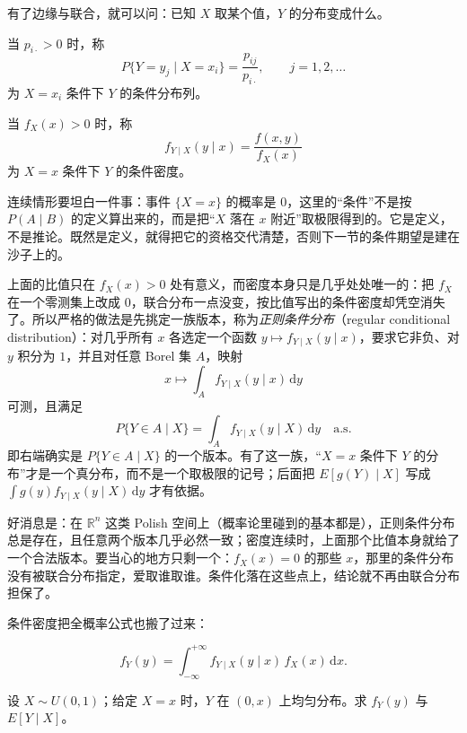 有了边缘与联合，就可以问：已知 $X$ 取某个值，$Y$ 的分布变成什么。

\begin{definition}[离散型条件分布]
当 $p_{i\cdot}>0$ 时，称
\[
P\{Y=y_j\mid X=x_i\}=\frac{p_{ij}}{p_{i\cdot}},\qquad j=1,2,\dots
\]
为 $X=x_i$ 条件下 $Y$ 的条件分布列。
\end{definition}

\begin{definition}[连续型条件密度]
当 $f_X(x)>0$ 时，称
\[
f_{Y\mid X}(y\mid x)=\frac{f(x,y)}{f_X(x)}
\]
为 $X=x$ 条件下 $Y$ 的条件密度。
\end{definition}

连续情形要坦白一件事：事件 $\{X=x\}$ 的概率是 $0$，这里的“条件”不是按 $P(A\mid B)$ 的定义算出来的，而是把“$X$ 落在 $x$ 附近”取极限得到的。它是定义，不是推论。既然是定义，就得把它的资格交代清楚，否则下一节的条件期望是建在沙子上的。

\begin{remark}[正则条件分布]
上面的比值只在 $f_X(x)>0$ 处有意义，而密度本身只是几乎处处唯一的：把 $f_X$ 在一个零测集上改成 $0$，联合分布一点没变，按比值写出的条件密度却凭空消失了。所以严格的做法是先挑定一族版本，称为\emph{正则条件分布}（regular conditional distribution）：对几乎所有 $x$ 各选定一个函数 $y\mapsto f_{Y\mid X}(y\mid x)$，要求它非负、对 $y$ 积分为 $1$，并且对任意 Borel 集 $A$，映射
\[
x\longmapsto \int_A f_{Y\mid X}(y\mid x)\,\mathrm{d}y
\]
可测，且满足
\[
P\{Y\in A\mid X\}=\int_A f_{Y\mid X}(y\mid X)\,\mathrm{d}y\quad\text{a.s.}
\]
即右端确实是 $P\{Y\in A\mid X\}$ 的一个版本。有了这一族，“$X=x$ 条件下 $Y$ 的分布”才是一个真分布，而不是一个取极限的记号；后面把 $E[g(Y)\mid X]$ 写成 $\int g(y)f_{Y\mid X}(y\mid X)\,\mathrm{d}y$ 才有依据。

好消息是：在 $\mathbb{R}^n$ 这类 Polish 空间上（概率论里碰到的基本都是），正则条件分布总是存在，且任意两个版本几乎必然一致；密度连续时，上面那个比值本身就给了一个合法版本。要当心的地方只剩一个：$f_X(x)=0$ 的那些 $x$，那里的条件分布没有被联合分布指定，爱取谁取谁。条件化落在这些点上，结论就不再由联合分布担保了。
\end{remark}

条件密度把全概率公式也搬了过来：

\begin{proposition}[连续型全概率公式]
\[
f_Y(y)=\int_{-\infty}^{+\infty} f_{Y\mid X}(y\mid x)\,f_X(x)\,\mathrm{d}x .
\]
\end{proposition}

\begin{example}
设 $X\sim U(0,1)$；给定 $X=x$ 时，$Y$ 在 $(0,x)$ 上均匀分布。求 $f_Y(y)$ 与 $E[Y\mid X]$。
\end{example}

